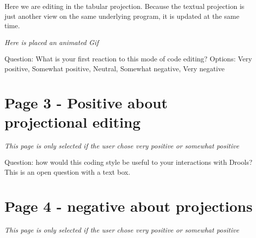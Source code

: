 Here we are editing in the tabular projection. 
Because the textual projection is just another view on the same underlying program, it is updated at the same time.

\emph{Here is placed an animated Gif}

Question: What is your first reaction to this mode of code editing?
Options: Very positive, Somewhat positive, Neutral, Somewhat negative, Very negative

\section{Page 3 - Positive about projectional editing}
\emph{This page is only selected if the user chose very positive or somewhat positive}

Question: how would this coding style be useful to your interactions with Drools?
This is an open question with a text box.

\section{Page 4 - negative about projections}
\emph{This page is only selected if the user chose very positive or somewhat positive}
